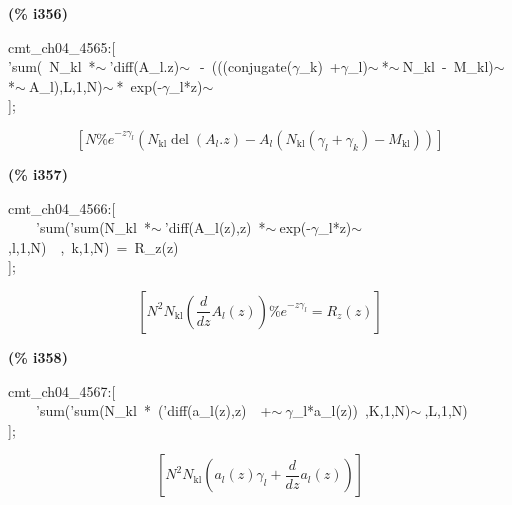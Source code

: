 \documentclass[fleqn]{article}
\begin{document}
\noindent
\begin{minipage}[t]{4.000000em}\color{red}\bfseries
(\% i356)	
\end{minipage}
\begin{minipage}[t]{\textwidth}\color{blue}
cmt\_ch04\_4565:[\\
'sum(\ N\_kl\ *\ensuremath{\sim\ }'diff(A\_l.z)\ensuremath{\sim\ }\ -\ (((conjugate(\ensuremath{\gamma}\_k)\ +\ensuremath{\gamma}\_l)\ensuremath{\sim\ }*\ensuremath{\sim\ }N\_kl\ -\ M\_kl)\ensuremath{\sim\ }*\ensuremath{\sim\ }A\_l),L,1,N)\ensuremath{\sim\ }*\ exp(-\ensuremath{\gamma}\_l*z)\ensuremath{\sim\ }\\
];
\end{minipage}
\[\displaystyle \tag{\% o356} 
\left[ N {{\% e}^{-z {{\gamma }_l}}} \left( {N_{\ensuremath{\mathrm{kl}}}} \operatorname{del}\left( {A_l}\ensuremath{\mathrm{ . }}z\right) -{A_l} \left( {N_{\ensuremath{\mathrm{kl}}}} \left( {{\gamma }_l}+{{\gamma }_k}\right) -{M_{\ensuremath{\mathrm{kl}}}}\right) \right) \right] \mbox{}
\]


\noindent
\begin{minipage}[t]{4.000000em}\color{red}\bfseries
(\% i357)	
\end{minipage}
\begin{minipage}[t]{\textwidth}\color{blue}
cmt\_ch04\_4566:[\\
\ \ \ \ 'sum('sum(N\_kl\ *\ensuremath{\sim\ }'diff(A\_l(z),z)\ *\ensuremath{\sim\ }exp(-\ensuremath{\gamma}\_l*z)\ensuremath{\sim\ },l,1,N)\ \ ,\ k,1,N)\ =\ R\_z(z)\\
];
\end{minipage}
\[\displaystyle \tag{\% o357} 
\left[ {{N}^{2}} {N_{\ensuremath{\mathrm{kl}}}} \left( \frac{d}{d z} {A_l}(z)\right)  {{\% e}^{-z {{\gamma }_l}}}={R_z}(z)\right] \mbox{}
\]


\noindent
\begin{minipage}[t]{4.000000em}\color{red}\bfseries
(\% i358)	
\end{minipage}
\begin{minipage}[t]{\textwidth}\color{blue}
cmt\_ch04\_4567:[\\
\ \ \ \ 'sum('sum(N\_kl\ *\ ('diff(a\_l(z),z)\ \ +\ensuremath{\sim\ }\ensuremath{\gamma}\_l*a\_l(z))\ ,K,1,N)\ensuremath{\sim\ },L,1,N)\\
];
\end{minipage}
\[\displaystyle \tag{\% o358} 
\left[ {{N}^{2}} {N_{\ensuremath{\mathrm{kl}}}} \left( {a_l}(z) {{\gamma }_l}+\frac{d}{d z} {a_l}(z)\right) \right] \mbox{}
\]
\end{document}
